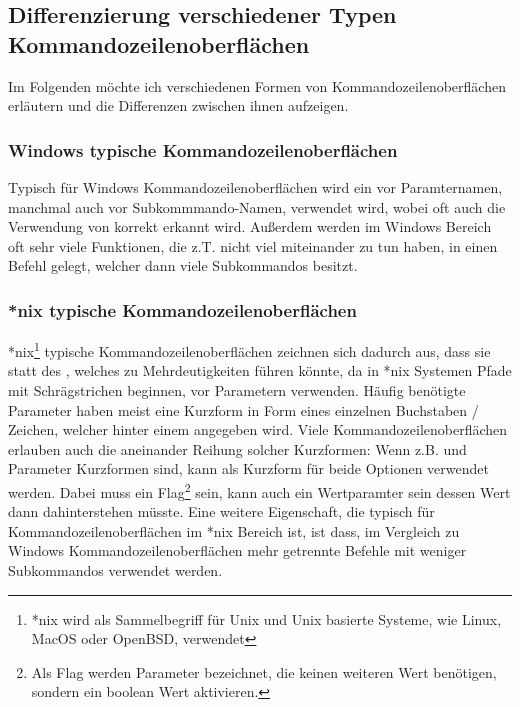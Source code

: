   \subsection{Differenzierung verschiedener Typen Kommandozeilenoberflächen}\label{subsec:DifferentCLITypes}
  Im Folgenden möchte ich verschiedenen Formen von Kommandozeilenoberflächen erläutern und die Differenzen zwischen ihnen aufzeigen.
  \subsubsection{Windows typische Kommandozeilenoberflächen}
  Typisch für Windows Kommandozeilenoberflächen wird ein \inlinecode{/} vor Paramternamen, manchmal auch vor Subkommmando-Namen, verwendet wird, wobei oft auch die Verwendung von \inlinecode{-} korrekt erkannt wird.
  Au\ss erdem werden im Windows Bereich oft sehr viele Funktionen, die z.T. nicht viel miteinander zu tun haben, in einen Befehl gelegt, welcher dann viele Subkommandos besitzt.
  \subsubsection{*nix typische Kommandozeilenoberflächen}
  *nix\footnote{*nix wird als Sammelbegriff für Unix und Unix basierte Systeme, wie Linux, MacOS oder OpenBSD, verwendet} typische Kommandozeilenoberflächen
  zeichnen sich dadurch aus, dass sie statt des \inlinecode{/}, welches zu Mehrdeutigkeiten führen könnte, da in *nix Systemen Pfade mit Schrägstrichen beginnen, vor Parametern \inlinecode{--} verwenden.
  Häufig benötigte Parameter haben meist eine Kurzform in Form eines einzelnen Buchstaben / Zeichen, welcher hinter einem \inlinecode{-} angegeben wird.
  Viele Kommandozeilenoberflächen erlauben auch die aneinander Reihung solcher Kurzformen:
  Wenn z.B.  und  Parameter Kurzformen sind, kann  als Kurzform für beide Optionen verwendet werden.
  Dabei muss  ein Flag\footnote{Als Flag werden Parameter bezeichnet, die keinen weiteren Wert benötigen, sondern ein boolean Wert aktivieren.} sein,
   kann auch ein Wertparamter sein dessen Wert dann dahinterstehen müsste.
  Eine weitere Eigenschaft, die typisch für Kommandozeilenoberflächen im *nix Bereich ist, ist dass,
  im Vergleich zu Windows Kommandozeilenoberflächen mehr getrennte Befehle mit weniger Subkommandos verwendet werden.
